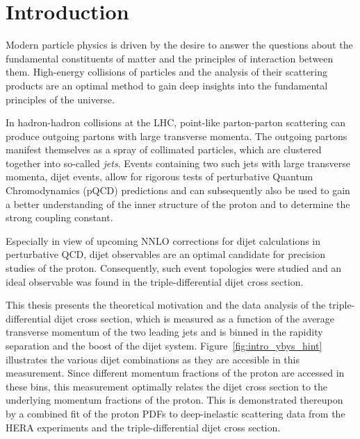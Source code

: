 
\chapter{Introduction}

Modern particle physics is driven by the desire to answer the questions about the
fundamental constituents of matter and the principles of interaction between
them. High-energy collisions of particles and the analysis of their
scattering products are an optimal method to gain deep insights into the
fundamental principles of the universe. 

In hadron-hadron collisions at the LHC, point-like parton-parton scattering can
produce outgoing partons with large transverse momenta. The outgoing partons
manifest themselves as a spray of collimated particles, which are clustered
together into so-called \emph{jets}. Events containing two such jets with large
transverse momenta, dijet events, allow for rigorous tests of perturbative
Quantum Chromodynamics (pQCD) predictions and can subsequently also be used to
gain a better understanding of the inner structure of the proton and to
determine the strong coupling constant.

Especially in view of upcoming NNLO corrections for dijet calculations in
perturbative QCD, dijet observables are an optimal candidate for precision
studies of the proton. Consequently, such event topologies were studied and an
ideal observable was found in the triple-differential dijet cross section.

This thesis presents the theoretical motivation and the data analysis of the
triple-differential dijet cross section, which is measured as a function of the
average transverse momentum of the two leading jets and is binned in the
rapidity separation and the boost of the dijet system.
Figure~\ref{fig:intro_ybys_hint} illustrates the various dijet combinations as
they are accesible in this measurement. Since different momentum fractions of
the proton are accessed in these bins, this measurement optimally relates the
dijet cross section to the underlying momentum fractions of the proton. This is
demonstrated thereupon by a combined fit of the proton PDFs to deep-inelastic
scattering data from the HERA experiments and the triple-differential dijet
cross section.

